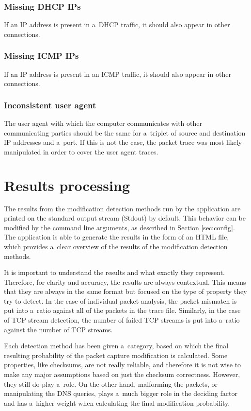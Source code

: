\documentclass[
  printed,     %
  color,       %
  oneside,     %
  nosansbold,  %
  nocolorbold, %
  nolof,         %
  nolot,         %
]{fithesis4}
\begin{document}
\subsubsection{Missing DHCP IPs}

If an IP address is present in a~DHCP traffic, it should also appear in other connections.

\subsubsection{Missing ICMP IPs}

If an IP address is present in an ICMP traffic, it should also appear in other connections.

\subsubsection{Inconsistent user agent}

The user agent with which the computer communicates with other communicating parties should be the same for a~triplet of source and destination IP addresses and a~port. If this is not the case, the packet trace was most likely manipulated in order to cover the user agent traces.

\newpage

\section{Results processing}
\label{sec:res}

The results from the modification detection methods run by the application are printed on the standard output stream (Stdout) by default. This behavior can be modified by the command line arguments, as described in Section \ref{sec:config}. The application is able to generate the results in the form of an HTML file, which provides a~clear overview of the results of the modification detection methods.

It is important to understand the results and what exactly they represent. Therefore, for clarity and accuracy, the results are always contextual. This means that they are always in the same format but focused on the type of property they try to detect. In the case of individual packet analysis, the packet mismatch is put into a~ratio against all of the packets in the trace file. Similarly, in the case of TCP stream detection, the number of failed TCP streams is put into a~ratio against the number of TCP streams. 

Each detection method has been given a~category, based on which the final resulting probability of the packet capture modification is calculated. Some properties, like checksums, are not really reliable, and therefore it is not wise to make any major assumptions based on just the checksum correctness. However, they still do play a~role. On the other hand, malforming the packets, or manipulating the DNS queries, plays a~much bigger role in the deciding factor and has a~higher weight when calculating the final modification probability.
\end{document}
